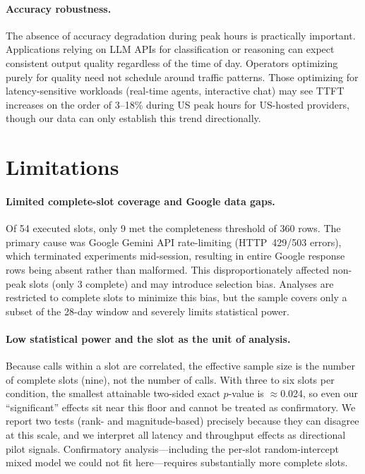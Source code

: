 \documentclass[11pt]{article}
\begin{document}
\paragraph{Accuracy robustness.}
The absence of accuracy degradation during peak hours is practically important.
Applications relying on LLM APIs for classification or reasoning can expect consistent
output quality regardless of the time of day.
Operators optimizing purely for quality need not schedule around traffic patterns.
Those optimizing for latency-sensitive workloads (real-time agents, interactive chat) may
see TTFT increases on the order of 3--18\% during US peak hours for US-hosted providers,
though our data can only establish this trend directionally.

\section{Limitations}
\label{sec:limitations}

\paragraph{Limited complete-slot coverage and Google data gaps.}
Of 54 executed slots, only 9 met the completeness threshold of 360 rows.
The primary cause was Google Gemini API rate-limiting (HTTP~429/503 errors), which
terminated experiments mid-session, resulting in entire Google response rows being absent
rather than malformed.
This disproportionately affected non-peak slots (only 3 complete) and may introduce
selection bias.
Analyses are restricted to complete slots to minimize this bias, but the sample covers only
a subset of the 28-day window and severely limits statistical power.

\paragraph{Low statistical power and the slot as the unit of analysis.}
Because calls within a slot are correlated, the effective sample size is the number of
complete slots (nine), not the number of calls. With three to six slots per condition, the
smallest attainable two-sided exact $p$-value is $\approx$0.024, so even our
``significant'' effects sit near this floor and cannot be treated as confirmatory.
We report two tests (rank- and magnitude-based) precisely because they can disagree at this
scale, and we interpret all latency and throughput effects as directional pilot signals.
Confirmatory analysis---including the per-slot random-intercept mixed model we could not fit
here---requires substantially more complete slots.
\end{document}
